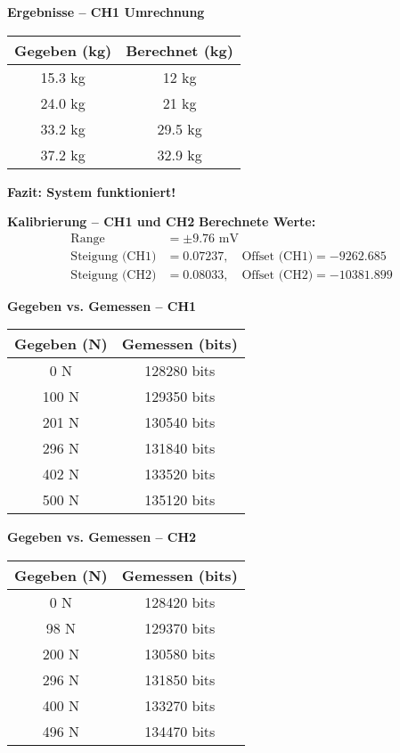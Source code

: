 \textbf{Ergebnisse – CH1 Umrechnung}
\begin{center}
\begin{tabular}{|c|c|}
\hline
\textbf{Gegeben (kg)} & \textbf{Berechnet (kg)} \\
\hline
15.3 kg & 12 kg \\
24.0 kg & 21 kg \\
33.2 kg & 29.5 kg \\
37.2 kg & 32.9 kg \\
\hline
\end{tabular}
\end{center}
\textbf{Fazit: System funktioniert!}

\textbf{Kalibrierung – CH1 und CH2}
\textbf{Berechnete Werte:}
\begin{align*}
\text{Range} &= \pm 9.76 \text{ mV} \\
\text{Steigung (CH1)} &= 0.07237, \quad \text{Offset (CH1)} = -9262.685 \\
\text{Steigung (CH2)} &= 0.08033, \quad \text{Offset (CH2)} = -10381.899
\end{align*}

\clearpage
\textbf{Gegeben vs. Gemessen – CH1}
\begin{center}
\begin{tabular}{|c|c|}
\hline
\textbf{Gegeben (N)} & \textbf{Gemessen (bits)} \\
\hline
0 N & 128280 bits \\
100 N & 129350 bits \\
201 N & 130540 bits \\
296 N & 131840 bits \\
402 N & 133520 bits \\
500 N & 135120 bits \\
\hline
\end{tabular}
\end{center}

\textbf{Gegeben vs. Gemessen – CH2}
\begin{center}
\begin{tabular}{|c|c|}
\hline
\textbf{Gegeben (N)} & \textbf{Gemessen (bits)} \\
\hline
0 N & 128420 bits \\
98 N & 129370 bits \\
200 N & 130580 bits \\
296 N & 131850 bits \\
400 N & 133270 bits \\
496 N & 134470 bits \\
\hline
\end{tabular}
\end{center}

